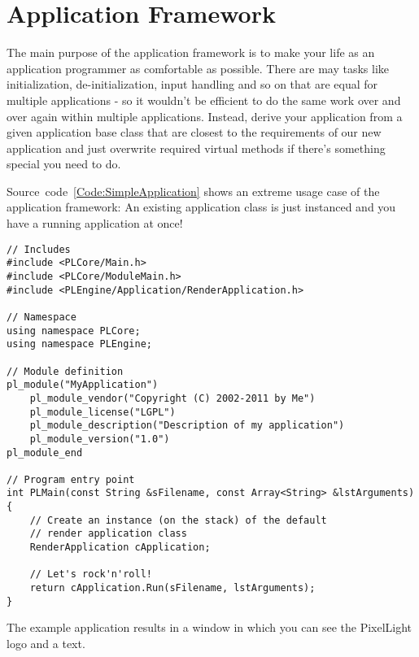 \chapter{Application Framework}
The main purpose of the application framework is to make your life as an application programmer as comfortable as possible. There are may tasks like initialization, de-initialization, input handling and so on that are equal for multiple applications - so it wouldn't be efficient to do the same work over and over again within multiple applications. Instead, derive your application from a given application base class that are closest to the requirements of our new application and just overwrite required virtual methods if there's something special you need to do.

Source~code~\ref{Code:SimpleApplication} shows an extreme usage case of the application framework: An existing application class is just instanced and you have a running application at once!
\begin{lstlisting}[label=Code:SimpleApplication,caption={Simple application using the application framework}]
// Includes
#include <PLCore/Main.h>
#include <PLCore/ModuleMain.h>
#include <PLEngine/Application/RenderApplication.h>

// Namespace
using namespace PLCore;
using namespace PLEngine;

// Module definition
pl_module("MyApplication")
	pl_module_vendor("Copyright (C) 2002-2011 by Me")
	pl_module_license("LGPL")
	pl_module_description("Description of my application")
	pl_module_version("1.0")
pl_module_end

// Program entry point
int PLMain(const String &sFilename, const Array<String> &lstArguments)
{
	// Create an instance (on the stack) of the default
	// render application class
	RenderApplication cApplication;

	// Let's rock'n'roll!
	return cApplication.Run(sFilename, lstArguments);
}
\end{lstlisting}
The example application results in a window in which you can see the PixelLight logo and a text.
